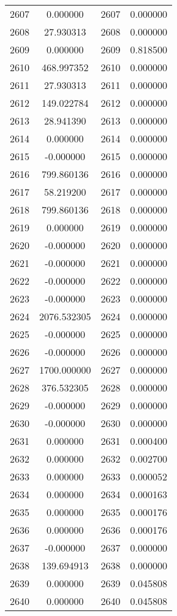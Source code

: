 \documentclass[12pt]{article}
\begin{document}
\begin{longtable}{@{}cccc@{}}
2607 & 0.000000 & 2607 & 0.000000 \\
2608 & 27.930313 & 2608 & 0.000000 \\
2609 & 0.000000 & 2609 & 0.818500 \\
2610 & 468.997352 & 2610 & 0.000000 \\
2611 & 27.930313 & 2611 & 0.000000 \\
2612 & 149.022784 & 2612 & 0.000000 \\
2613 & 28.941390 & 2613 & 0.000000 \\
2614 & 0.000000 & 2614 & 0.000000 \\
2615 & -0.000000 & 2615 & 0.000000 \\
2616 & 799.860136 & 2616 & 0.000000 \\
2617 & 58.219200 & 2617 & 0.000000 \\
2618 & 799.860136 & 2618 & 0.000000 \\
2619 & 0.000000 & 2619 & 0.000000 \\
2620 & -0.000000 & 2620 & 0.000000 \\
2621 & -0.000000 & 2621 & 0.000000 \\
2622 & -0.000000 & 2622 & 0.000000 \\
2623 & -0.000000 & 2623 & 0.000000 \\
2624 & 2076.532305 & 2624 & 0.000000 \\
2625 & -0.000000 & 2625 & 0.000000 \\
2626 & -0.000000 & 2626 & 0.000000 \\
2627 & 1700.000000 & 2627 & 0.000000 \\
2628 & 376.532305 & 2628 & 0.000000 \\
2629 & -0.000000 & 2629 & 0.000000 \\
2630 & -0.000000 & 2630 & 0.000000 \\
2631 & 0.000000 & 2631 & 0.000400 \\
2632 & 0.000000 & 2632 & 0.002700 \\
2633 & 0.000000 & 2633 & 0.000052 \\
2634 & 0.000000 & 2634 & 0.000163 \\
2635 & 0.000000 & 2635 & 0.000176 \\
2636 & 0.000000 & 2636 & 0.000176 \\
2637 & -0.000000 & 2637 & 0.000000 \\
2638 & 139.694913 & 2638 & 0.000000 \\
2639 & 0.000000 & 2639 & 0.045808 \\
2640 & 0.000000 & 2640 & 0.045808 \\

\end{longtable}
\end{document}
